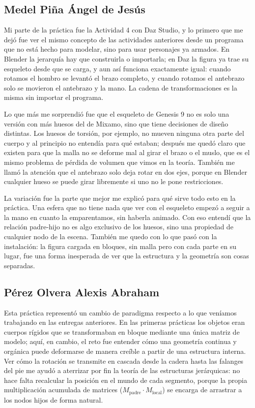 \subsection{Medel Piña Ángel de Jesús}
Mi parte de la práctica fue la Actividad 4 con Daz Studio, y lo primero que me dejó fue ver el mismo concepto de las actividades anteriores desde un programa que no está hecho para modelar, sino para usar personajes ya armados. En Blender la jerarquía hay que construirla o importarla; en Daz la figura ya trae su esqueleto desde que se carga, y aun así funciona exactamente igual: cuando rotamos el hombro se levantó el brazo completo, y cuando rotamos el antebrazo solo se movieron el antebrazo y la mano. La cadena de transformaciones es la misma sin importar el programa.

Lo que más me sorprendió fue que el esqueleto de Genesis 9 no es solo una versión con más huesos del de Mixamo, sino que tiene decisiones de diseño distintas. Los huesos de torsión, por ejemplo, no mueven ninguna otra parte del cuerpo y al principio no entendía para qué estaban; después me quedó claro que existen para que la malla no se deforme mal al girar el brazo o el muslo, que es el mismo problema de pérdida de volumen que vimos en la teoría. También me llamó la atención que el antebrazo solo deja rotar en dos ejes, porque en Blender cualquier hueso se puede girar libremente si uno no le pone restricciones.

La variación fue la parte que mejor me explicó para qué sirve todo esto en la práctica. Una esfera que no tiene nada que ver con el esqueleto empezó a seguir a la mano en cuanto la emparentamos, sin haberla animado. Con eso entendí que la relación padre-hijo no es algo exclusivo de los huesos, sino una propiedad de cualquier nodo de la escena. También me quedo con lo que pasó con la instalación: la figura cargada en bloques, sin malla pero con cada parte en su lugar, fue una forma inesperada de ver que la estructura y la geometría son cosas separadas.


\subsection{Pérez Olvera Alexis Abraham}
Esta práctica representó un cambio de paradigma respecto a lo que veníamos trabajando en las entregas anteriores. En las primeras prácticas los objetos eran cuerpos rígidos que se transformaban en bloque mediante una única matriz de modelo; aquí, en cambio, el reto fue entender cómo una geometría continua y orgánica puede deformarse de manera creíble a partir de una estructura interna. Ver cómo la rotación se transmite en cascada desde la cadera hasta las falanges del pie me ayudó a aterrizar por fin la teoría de las estructuras jerárquicas: no hace falta recalcular la posición en el mundo de cada segmento, porque la propia multiplicación acumulada de matrices ($M_{\text{padre}} \cdot M_{\text{local}}$) se encarga de arrastrar a los nodos hijos de forma natural.


